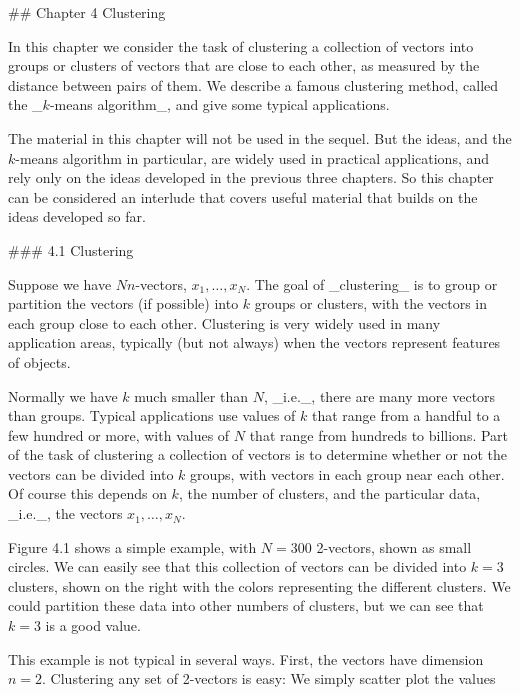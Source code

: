 

## Chapter 4 Clustering

In this chapter we consider the task of clustering a collection of vectors into groups or clusters of vectors that are close to each other, as measured by the distance between pairs of them. We describe a famous clustering method, called the _\(k\)-means algorithm_, and give some typical applications.

The material in this chapter will not be used in the sequel. But the ideas, and the \(k\)-means algorithm in particular, are widely used in practical applications, and rely only on the ideas developed in the previous three chapters. So this chapter can be considered an interlude that covers useful material that builds on the ideas developed so far.

### 4.1 Clustering

Suppose we have \(N\)\(n\)-vectors, \(x_{1},\ldots,x_{N}\). The goal of _clustering_ is to group or partition the vectors (if possible) into \(k\) groups or clusters, with the vectors in each group close to each other. Clustering is very widely used in many application areas, typically (but not always) when the vectors represent features of objects.

Normally we have \(k\) much smaller than \(N\), _i.e._, there are many more vectors than groups. Typical applications use values of \(k\) that range from a handful to a few hundred or more, with values of \(N\) that range from hundreds to billions. Part of the task of clustering a collection of vectors is to determine whether or not the vectors can be divided into \(k\) groups, with vectors in each group near each other. Of course this depends on \(k\), the number of clusters, and the particular data, _i.e._, the vectors \(x_{1},\ldots,x_{N}\).

Figure 4.1 shows a simple example, with \(N=300\) 2-vectors, shown as small circles. We can easily see that this collection of vectors can be divided into \(k=3\) clusters, shown on the right with the colors representing the different clusters. We could partition these data into other numbers of clusters, but we can see that \(k=3\) is a good value.

This example is not typical in several ways. First, the vectors have dimension \(n=2\). Clustering any set of 2-vectors is easy: We simply scatter plot the values